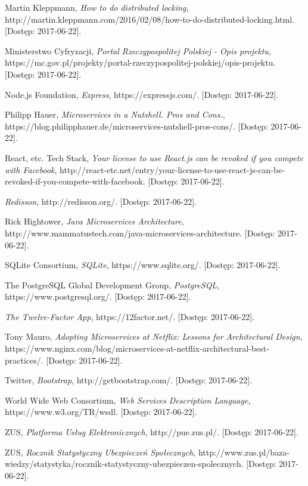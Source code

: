 \documentclass[licencjacka]{pracamgr}
\begin{document}
\begin{thebibliography}{99}
 Martin Kleppmann, \textit{How to do distributed locking},
http://martin.kleppmann.com/2016/02/08/how-to-do-distributed-locking.html. [Dostęp: 2017-06-22].

 Ministerstwo Cyfryzacji, \textit{Portal Rzeczypospolitej Polskiej - Opis projektu},
https://mc.gov.pl/projekty/portal-rzeczypospolitej-polskiej/opis-projektu. [Dostęp: 2017-06-22].

 Node.js Foundation, \textit{Express},
https://expressjs.com/. [Dostęp: 2017-06-22].

 Philipp Hauer, \textit{Microservices in a Nutshell. Pros and Cons.},
https://blog.philipphauer.de/microservices-nutshell-pros-cons/. [Dostęp: 2017-06-22].

 React, etc. Tech Stack, \textit{Your license to use React.js can be revoked if you compete with Facebook},
http://react-etc.net/entry/your-license-to-use-react-js-can-be-revoked-if-you-compete-with-facebook. [Dostęp: 2017-06-22].

 \textit{Redisson},
http://redisson.org/. [Dostęp: 2017-06-22].

 Rick Hightower, \textit{Java Microservices Architecture},
http://www.mammatustech.com/java-microservices-architecture. [Dostęp: 2017-06-22].

 SQLite Consortium, \textit{SQLite},
https://www.sqlite.org/. [Dostęp: 2017-06-22].

 The PostgreSQL Global Development Group, \textit{PostgreSQL},
https://www.postgresql.org/. [Dostęp: 2017-06-22].

 \textit{The Twelve-Factor App}, https://12factor.net/. [Dostęp: 2017-06-22].

 Tony Mauro, \textit{Adopting Microservices at Netflix: Lessons for Architectural Design},
https://www.nginx.com/blog/microservices-at-netflix-architectural-best-practices/. [Dostęp: 2017-06-22].

 Twitter, \textit{Bootstrap},
http://getbootstrap.com/. [Dostęp: 2017-06-22].

 World Wide Web Consortium, \textit{Web Services Description Language},
https://www.w3.org/TR/wsdl. [Dostęp: 2017-06-22].

 ZUS, \textit{Platforma Usług Elektronicznych},
http://pue.zus.pl/. [Dostęp: 2017-06-22].

 ZUS, \textit{Rocznik Statystyczny Ubezpieczeń Społecznych},
http://www.zus.pl/baza-wiedzy/statystyka/rocznik-statystyczny-ubezpieczen-spolecznych. [Dostęp: 2017-06-22].

\end{thebibliography}
\end{document}
